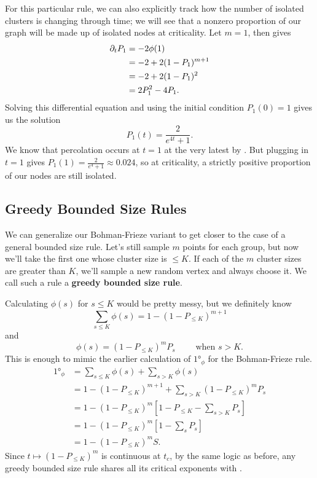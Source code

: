 \documentclass[twoside,10pt]{article}
\newcommand{\BF}{Bohman-Frieze\xspace}
\begin{document}
\begin{ex}[]
	\label{nonzero-at-criticality}
For this particular rule, we can also explicitly track how the number of isolated clusters is changing through time; we will see that a nonzero proportion of our graph will be made up of isolated nodes at criticality. Let $m=1$, then  gives
\begin{align*}
        \partial_{t}{P_1} &= -2 \phi(1) \\
                    &= -2 + 2(1-P_1)^{m+1} \\
                    &= -2 + 2(1-P_1)^{2} \\
                    &= 2P_1^{2} - 4P_1.
\end{align*}
Solving this differential equation and using the initial condition $P_1(0)=1$ gives us the solution
\[
        P_1(t) = \frac{2}{e^{4t}+1} .
\]
We know that percolation occurs at $t=1$ at the very latest by \cite{RW-cont}. But plugging in $t=1$ gives $P_1(1) = \frac{2}{e^{4}+1} \approx 0.024$, so at criticality, a strictly positive proportion of our nodes are still isolated.
\end{ex}

\subsection{Greedy Bounded Size Rules}
\label{greedy-rules}

We can generalize our \BF variant to get closer to the case of a general bounded size rule. Let's still sample $m$ points for each group, but now we'll take the first one whose cluster size is $\leq K$. If each of the $m$ cluster sizes are greater than $K$, we'll sample a new random vertex and always choose it. We call such a rule a \textbf{greedy bounded size rule}.

Calculating $\phi(s)$ for $s \leq K$ would be pretty messy, but we definitely know
\[
        \sum_{s \leq K} \phi(s) = 1 - (1-P_{\leq K})^{m+1}
\] and
\[
        \phi(s) = (1-P_{\leq K})^{m}P_{s} \qquad \text{ when } s>K.
\] This is enough to mimic the earlier calculation of $\ang{1}_{\phi}$ for the \BF rule.
\begin{align*}
        \ang{1}_{\phi} &= \sum_{s \leq K}\phi(s) + \sum_{s > K}\phi(s) \\
                       &= 1 - (1-P_{\leq K})^{m+1} + \sum_{s>K}(1-P_{\leq K})^{m}P_s \\
                       &= 1 - (1-P_{\leq K})^{m} \left[ 1 - P_{\leq K}-\sum_{s>K}P_s \right] \\
                       &= 1 - (1-P_{\leq K})^{m} \left[ 1 - \sum_s P_s \right] \\
                       &= 1 - (1-P_{\leq K})^{m} S.
\end{align*}
Since $t \mapsto (1-P_{\leq K})^{m}$ is continuous at $t_c$, by the same logic as before, any greedy bounded size rule shares all its critical exponents with \ER.
\end{document}
